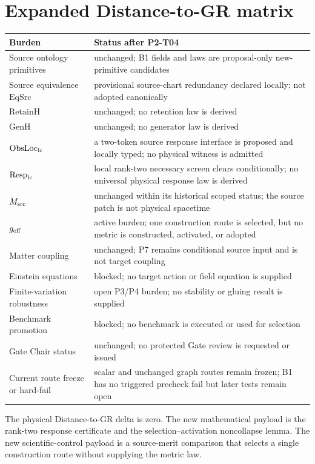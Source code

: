 \documentclass[11pt]{article}
\begin{document}
\section{Expanded Distance-to-GR matrix}

\begin{longtable}{p{}p{}}
\toprule
Burden & Status after P2-T04\\
\midrule
Source ontology primitives & unchanged; B1 fields and laws are proposal-only new-primitive candidates\\
Source equivalence $\mathrm{EqSrc}$ & provisional source-chart redundancy declared locally; not adopted canonically\\
$\mathrm{RetainH}$ & unchanged; no retention law is derived\\
$\mathrm{GenH}$ & unchanged; no generator law is derived\\
$\mathrm{ObsLoc}_{\rm lc}$ & a two-token source response interface is proposed and locally typed; no physical witness is admitted\\
$\mathrm{Resp}_{\rm lc}$ & local rank-two necessary screen clears conditionally; no universal physical response law is derived\\
$M_{\rm src}$ & unchanged within its historical scoped status; the source patch is not physical spacetime\\
$g_{\rm eff}$ & active burden; one construction route is selected, but no metric is constructed, activated, or adopted\\
Matter coupling & unchanged; P7 remains conditional source input and is not target coupling\\
Einstein equations & blocked; no target action or field equation is supplied\\
Finite-variation robustness & open P3/P4 burden; no stability or gluing result is supplied\\
Benchmark promotion & blocked; no benchmark is executed or used for selection\\
Gate Chair status & unchanged; no protected Gate review is requested or issued\\
Current route freeze or hard-fail & scalar and unchanged graph routes remain frozen; B1 has no triggered precheck fail but later tests remain open\\
\bottomrule
\end{longtable}

The physical Distance-to-GR delta is zero. The new mathematical payload is the
rank-two response certificate and the selection--activation noncollapse lemma.
The new scientific-control payload is a source-merit comparison that selects a
single construction route without supplying the metric law.
\end{document}
